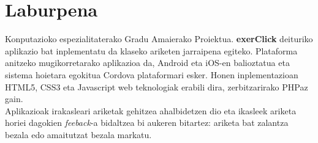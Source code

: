 \section*{Laburpena}

Konputazioko espezialitaterako Gradu Amaierako Proiektua. \textbf{exerClick} deituriko aplikazio bat inplementatu da klaseko ariketen jarraipena egiteko. Plataforma anitzeko mugikorretarako aplikazioa da, Android eta iOS-en balioztatua eta sistema hoietara egokitua Cordova plataformari esker. Honen inplementazioan HTML5, CSS3 eta Javascript web teknologiak erabili dira, zerbitzarirako PHPaz gain.\\

Aplikazioak irakasleari ariketak gehitzea ahalbidetzen dio eta ikasleek ariketa horiei dagokien \textit{feeback}-a bidaltzea bi aukeren bitartez: ariketa bat zalantza bezala edo amaitutzat bezala markatu.\\